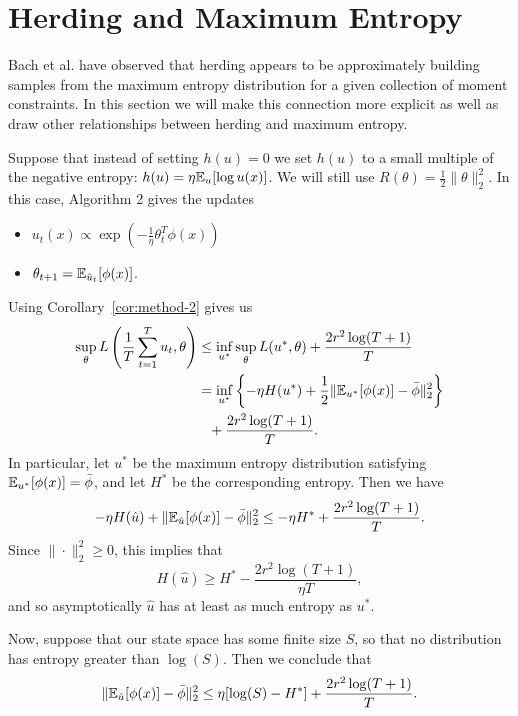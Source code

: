 \documentclass{article}
\begin{document}
\section{Herding and Maximum Entropy}
\label{sec:max-ent}

Bach et al. have observed that herding appears to be approximately building 
samples from the maximum entropy distribution for a given collection of moment 
constraints. In this section we will make this connection more explicit 
as well as draw other relationships between herding and maximum entropy.

Suppose that instead of setting $h(u) = 0$ we set $h(u)$ to a small multiple of 
the negative entropy: $h(u) = \eta \mathbb{E}_{u}[\log u(x)]$. We will still use 
$R(\theta) = \frac{1}{2}\|\theta\|_2^2$. In this case, Algorithm 2 gives the updates
\begin{itemize}
\item $u_t(x) \propto \exp\left(-\frac{1}{\eta}\theta_t^T\phi(x)\right)$
\item $\theta_{t+1} = \mathbb{E}_{\hat{u}_t}[\phi(x)]$.
\end{itemize}
Using Corollary~\ref{cor:method-2} gives us
\begin{align*}
\sup_{\theta} L\left(\frac{1}{T} \sum_{t=1}^T u_t, \theta\right) &\leq \inf_{u^*} \sup_{\theta} L(u^*, \theta) + \frac{2r^2\log(T+1)}{T} \\
 &= \inf_{u^*} \left\{-\eta H(u^*) + \frac{1}{2}\|\mathbb{E}_{u^*}[\phi(x)]-\bar{\phi}\|_2^2\right\} \\ &\phantom{=} + \frac{2r^2\log(T+1)}{T}.
\end{align*}
In particular, let $u^*$ be the maximum entropy distribution satisfying $\mathbb{E}_{u^*}[\phi(x)] = \bar{\phi}$, 
and let $H^*$ be the corresponding entropy. Then we have 
\[ -\eta H(\hat{u}) + \|\mathbb{E}_{\hat{u}}[\phi(x)]-\bar{\phi}\|_2^2 \leq -\eta H^* + \frac{2r^2\log(T+1)}{T}. \]
Since $\|\cdot\|_2^2 \geq 0$, this implies that 
\begin{equation}
H(\hat{u}) \geq H^* - \frac{2r^2\log(T+1)}{\eta T},
\end{equation}
 and so asymptotically $\hat{u}$ has at least 
as much entropy as $u^*$.

Now, suppose that our state space has some finite size $S$, so 
that no distribution has entropy greater than $\log(S)$. Then 
we conclude that
\begin{equation}
\|\mathbb{E}_{\hat{u}}[\phi(x)]-\bar{\phi}\|_2^2 \leq \eta[\log(S)-H^*] + \frac{2r^2\log(T+1)}{T}.
\end{equation}
\end{document}
